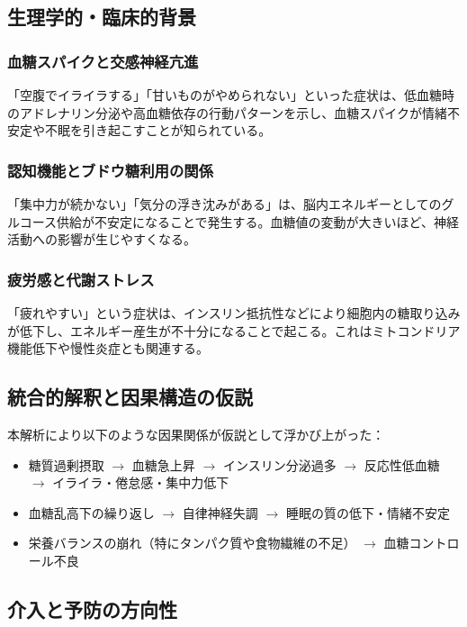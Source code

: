 \documentclass[a4paper,12pt]{article}
\begin{document}
\subsection*{生理学的・臨床的背景}

\subsubsection*{血糖スパイクと交感神経亢進}

「空腹でイライラする」「甘いものがやめられない」といった症状は、低血糖時のアドレナリン分泌や高血糖依存の行動パターンを示し、血糖スパイクが情緒不安定や不眠を引き起こすことが知られている。

\subsubsection*{認知機能とブドウ糖利用の関係}

「集中力が続かない」「気分の浮き沈みがある」は、脳内エネルギーとしてのグルコース供給が不安定になることで発生する。血糖値の変動が大きいほど、神経活動への影響が生じやすくなる。

\subsubsection*{疲労感と代謝ストレス}

「疲れやすい」という症状は、インスリン抵抗性などにより細胞内の糖取り込みが低下し、エネルギー産生が不十分になることで起こる。これはミトコンドリア機能低下や慢性炎症とも関連する。

\subsection*{統合的解釈と因果構造の仮説}

本解析により以下のような因果関係が仮説として浮かび上がった：

\begin{itemize}
  \item 糖質過剰摂取 $\rightarrow$ 血糖急上昇 $\rightarrow$ インスリン分泌過多 $\rightarrow$ 反応性低血糖 $\rightarrow$ イライラ・倦怠感・集中力低下
  \item 血糖乱高下の繰り返し $\rightarrow$ 自律神経失調 $\rightarrow$ 睡眠の質の低下・情緒不安定
  \item 栄養バランスの崩れ（特にタンパク質や食物繊維の不足） $\rightarrow$ 血糖コントロール不良
\end{itemize}

\subsection*{介入と予防の方向性}
\end{document}

